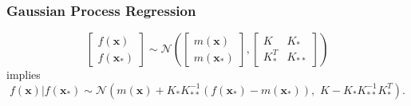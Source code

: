 \documentclass{beamer}
\begin{document}
\begin{frame}
    \frametitle{Gaussian Process Regression}
    $$
        \begin{bmatrix}
            f(\mathbf{x}) \\
            f(\mathbf{x}_*)
        \end{bmatrix} \sim \mathcal{N}\left(
        \begin{bmatrix}
                m(\mathbf{x}) \\
                m(\mathbf{x}_*)
            \end{bmatrix}, \begin{bmatrix}
                K       & K_{*}  \\
                K_{*}^T & K_{**}
            \end{bmatrix}
        \right)
    $$ implies
    $$
        f(\mathbf{x}) | f(\mathbf{x}_*)
        \sim \mathcal{N}\left(
        m(\mathbf{x}) + K_{*}K_{**}^{-1}(f(\mathbf{x}_*) - m(\mathbf{x}_*)), \,\,
        K - K_{*}K_{**}^{-1}K_{*}^T
        \right).
    $$
\end{frame}
\end{document}
